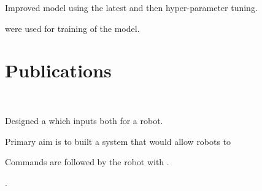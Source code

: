\documentclass[]{deedy-resume-openfont}
\begin{document}
\begin{minipage}[t]{0.66\textwidth}
\begin{tightemize}
\item Improved model using the latest  and then hyper-parameter tuning.

\item {} were used for training of the model.
\end{tightemize}
\sectionsep

\section{Publications}


\href{http://robita.iiita.ac.in/}{}\\
\begin{tightemize}
\item Designed a  which inputs both  for a robot.
\item Primary aim is to built a system that would allow robots to 
\item {} Commands are followed by the robot with .

\item {}.
\end{tightemize}
\sectionsep



\end{minipage}
\end{document}
